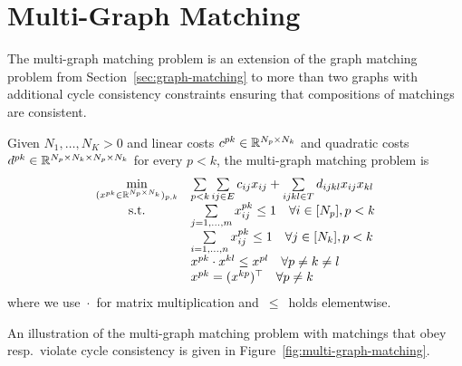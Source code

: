\section{Multi-Graph Matching}
\label{sec:multi-graph-matching}
The multi-graph matching problem is an extension of the graph matching problem from Section~\ref{sec:graph-matching} to more than two graphs with additional cycle consistency constraints ensuring that compositions of matchings are consistent.

\begin{definition}
Given $N_1,\ldots,N_K > 0$ and linear costs $c^{pk} \in \mathbb{R}^{N_p \times N_k}$ and quadratic costs $d^{pk} \in \mathbb{R}^{N_p \times N_k \times N_p \times N_k}$ for every $p < k$, the multi-graph matching problem is
\begin{equation}
\begin{array}{cl}
    \min\limits_{(x^{pk} \in \mathbb{R}^{N_p \times N_k})_{p,k}}
    &\sum\limits_{p < k} \sum\limits_{ij \in E} c_{ij} x_{ij} + \sum\limits_{ijkl \in T} d_{ijkl} x_{ij} x_{kl} \\ 
\text{s.t.}
& \sum\limits_{j=1,\ldots,m} x^{pk}_{ij} \leq 1 \quad \forall i\in [N_p], p < k \\
& \sum\limits_{i=1,\ldots,n} x^{pk}_{ij} \leq 1 \quad \forall j\in [N_k], p < k \\
& x^{pk} \cdot x^{kl} \leq x^{pl} \quad \forall p \neq k \neq l \\
    & x^{pk} = (x^{kp})^\top \quad \forall p \neq k
\end{array}
\end{equation}
where we use~$\cdot$~for matrix multiplication and~$\leq$~holds elementwise.
\end{definition}

An illustration of the multi-graph matching problem with matchings that obey resp.\ violate cycle consistency is given in Figure~\ref{fig:multi-graph-matching}.

